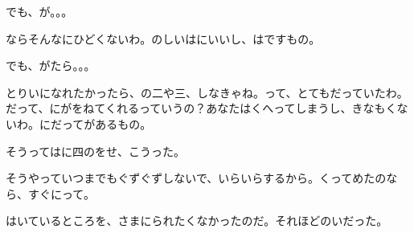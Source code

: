でも、が。。。

ならそんなにひどくないわ。のしいはにいいし、はですもの。

でも、がたら。。。

とりいになれたかったら、の二や三、しなきゃね。って、とてもだっていたわ。だって、にがをねてくれるっていうの？あなたはくへってしまうし、きなもくないわ。にだってがあるもの。

そうってはに四のをせ、こうった。

そうやっていつまでもぐずぐずしないで、いらいらするから。くってめたのなら、すぐにって。

はいているところを、さまにられたくなかったのだ。それほどのいだった。


